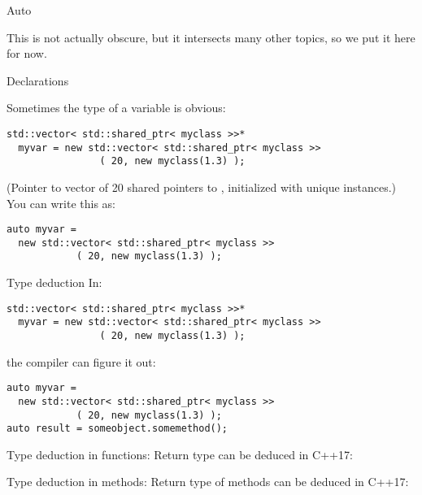 
 {Auto}

This is not actually obscure, but it intersects many other topics, so
we put it here for now.

 {Declarations}

Sometimes the type of a variable is obvious:
\begin{lstlisting}
std::vector< std::shared_ptr< myclass >>*
  myvar = new std::vector< std::shared_ptr< myclass >>
                ( 20, new myclass(1.3) );
\end{lstlisting}
(Pointer to vector of 20 shared pointers to , initialized
with unique instances.)  You can write this as:
\begin{lstlisting}
auto myvar =
  new std::vector< std::shared_ptr< myclass >>
            ( 20, new myclass(1.3) );
\end{lstlisting}

\begin{slide}{Type deduction}
  \label{sl:auto-deduct}
In:
\begin{lstlisting}
std::vector< std::shared_ptr< myclass >>*
  myvar = new std::vector< std::shared_ptr< myclass >>
                ( 20, new myclass(1.3) );
\end{lstlisting}
the compiler can figure it out:
\begin{lstlisting}
auto myvar =
  new std::vector< std::shared_ptr< myclass >>
            ( 20, new myclass(1.3) );
auto result = someobject.somemethod();
\end{lstlisting}
\end{slide}

\begin{block}{Type deduction in functions}:
  \label{sl:auto-fun}
  Return type can be deduced in C++17:
\end{block}

\begin{block}{Type deduction in methods}:
  \label{sl:auto-method}
  Return type of methods can be deduced in C++17:
\end{block}

